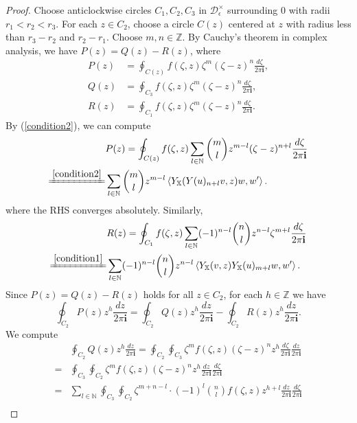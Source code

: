 \documentclass[11pt,b5paper,notitlepage]{article}
\theoremstyle{definition}
\theoremstyle{plain}
\newcommand{\im}{\mathbf{i}}
\newcommand{\Xbb}{\mathbb X}
\newcommand{\Nbb}{\mathbb N}
\newcommand{\Zbb}{\mathbb Z}
\newcommand{\<}{\left\langle}
\renewcommand{\>}{\right\rangle}
\newcommand{\MD}{\mathcal{D}}
\numberwithin{equation}{section}
\begin{document}
\begin{proof}
Choose anticlockwise circles $C_1,C_2,C_3$ in $\MD_\epsilon^\times $ surrounding $0$ with radii $r_1<r_2<r_3$. For each $z\in C_2$, choose a circle $C(z)$ centered at $z$ with radius less than $r_3-r_2$ and $r_2-r_1$. Choose $m,n\in \Zbb$. By Cauchy's theorem in complex analysis, we have $P(z)=Q(z)-R(z)$, where
    $$
    \begin{aligned}
        P(z)&=\oint_{C(z)}f(\zeta,z)\zeta^m (\zeta-z)^n \frac{d\zeta}{2\pi\im},\\
        Q(z)&=\oint_{C_3}f(\zeta,z)\zeta^m (\zeta-z)^n \frac{d\zeta}{2\pi\im},\\
        R(z)&=\oint_{C_1}f(\zeta,z)\zeta^m (\zeta-z)^n \frac{d\zeta}{2\pi\im}.
    \end{aligned}
    $$
    By (\ref{condition2}), we can compute
\begin{align}
        & P(z)=\oint_{C(z)}f(\zeta,z)\sum_{l\in \Nbb}\binom{m}{l}z^{m-l}(\zeta-z)^{n+l}\frac{d\zeta}{2\pi\im}  \nonumber\\
\xlongequal{\eqref{condition2}}&\sum_{l\in \Nbb}\binom{m}{l}z^{m-l} \<Y_\Xbb(Y(u)_{n+l}v,z)w,w'\>.  \label{eq74}
\end{align}
where the RHS converges absolutely. Similarly,
\begin{align}
&R(z)=\oint_{C_1}f(\zeta,z)\sum_{l\in \Nbb}(-1)^{n-l}\binom{n}{l}z^{n-l}\zeta^{m+l} \frac{d\zeta}{2\pi\im}  \nonumber\\
\xlongequal{\eqref{condition1}}&\sum_{l\in \Nbb}(-1)^{n-l}\binom{n}{l}z^{n-l}\<Y_\Xbb(v,z)Y_\Xbb(u)_{m+l}w,w'\>. \label{eq75}
\end{align}
    Since $P(z)=Q(z)-R(z)$ holds for all $z\in C_2$, for each $h\in \Zbb$ we have 
    \begin{equation}\label{criterion1}
    \oint_{C_2}P(z)z^h\frac{dz}{2\pi\im}=\oint_{C_2}Q(z)z^h\frac{dz}{2\pi\im}-\oint_{C_2}R(z)z^h\frac{dz}{2\pi\im}.
    \end{equation}
We compute
\begin{align}
        &\oint_{C_2}Q(z)z^h\frac{dz}{2\pi\im}=\oint_{C_2} \oint_{C_3}\zeta^mf(\zeta,z)(\zeta-z)^n z^h \frac{d\zeta}{2\pi\im}\frac{dz}{2\pi\im} \nonumber\\
=&\oint_{C_3}\oint_{C_2}\zeta^m f(\zeta,z)(\zeta-z)^n z^h \frac{dz}{2\pi\im}\frac{d\zeta}{2\pi\im} \nonumber\\
        =&\sum_{l\in \Nbb}\oint_{C_3}\oint_{C_2}\zeta^{m+n-l}\cdot(-1)^l \binom{n}{l}f(\zeta,z) z^{h+l}\frac{dz}{2\pi\im}\frac{d\zeta}{2\pi\im} \nonumber\\

\end{align}
\end{proof}
\end{document}

